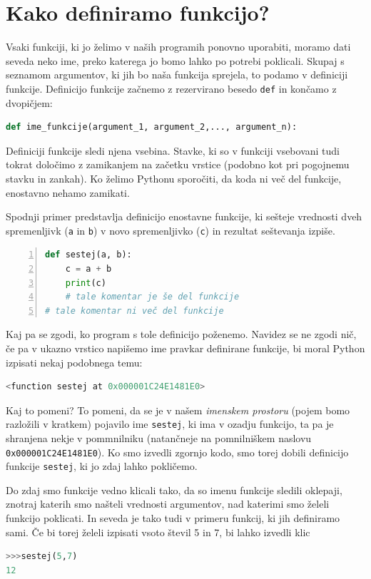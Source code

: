 \section{Kako definiramo funkcijo?}

Vsaki funkciji, ki jo želimo v naših programih ponovno uporabiti, moramo dati seveda neko ime, preko katerega jo bomo lahko po potrebi poklicali. Skupaj s seznamom argumentov, ki jih bo naša funkcija sprejela, to podamo v definiciji funkcije. Definicijo funkcije začnemo z rezervirano besedo \texttt{def} in končamo z dvopičjem:

\begin{lstlisting}[language=Python]
def ime_funkcije(argument_1, argument_2,..., argument_n):
\end{lstlisting}

Definiciji funkcije sledi njena vsebina. Stavke, ki so v funkciji vsebovani tudi tokrat določimo z zamikanjem na začetku vrstice (podobno kot pri pogojnemu stavku in zankah). Ko želimo Pythonu sporočiti, da koda ni več del funkcije, enostavno nehamo zamikati.

Spodnji primer predstavlja definicijo enostavne funkcije, ki sešteje vrednosti dveh spremenljivk (\texttt{a} in \texttt{b}) v novo spremenljivko (\texttt{c}) in rezultat seštevanja izpiše.
\begin{lstlisting}[language=Python,numbers=left]
def sestej(a, b):
    c = a + b
    print(c)
    # tale komentar je še del funkcije
# tale komentar ni več del funkcije
\end{lstlisting}

Kaj pa se zgodi, ko program s tole definicijo poženemo. Navidez se ne zgodi nič, če pa v ukazno vrstico napišemo ime pravkar definirane funkcije, bi moral Python izpisati nekaj podobnega temu:
\begin{lstlisting}[language=Python]
<function sestej at 0x000001C24E1481E0>
\end{lstlisting}
Kaj to pomeni? To pomeni, da se je v našem \emph{imenskem prostoru} (pojem bomo razložili v kratkem) pojavilo ime \texttt{sestej}, ki ima v ozadju funkcijo, ta pa je shranjena nekje v pommnilniku (natančneje na pomnilniškem naslovu \texttt{0x000001C24E1481E0}). Ko smo izvedli zgornjo kodo, smo torej dobili definicijo funkcije \texttt{sestej}, ki jo zdaj lahko pokličemo.

Do zdaj smo funkcije vedno klicali tako, da so imenu funkcije sledili oklepaji, znotraj katerih smo našteli vrednosti argumentov, nad katerimi smo želeli funkcijo poklicati. In seveda je tako tudi v primeru funkcij, ki jih definiramo sami. Če bi torej želeli izpisati vsoto števil 5 in 7, bi lahko izvedli klic
\begin{lstlisting}[language=Python]
>>>sestej(5,7)
12
\end{lstlisting}

